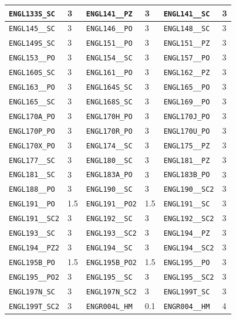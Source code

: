 \begin{longtable}{|l|l||l|l||l|l|}
    \verb|ENGL133S_SC| & 3 & \verb|ENGL141__PZ| & 3 & \verb|ENGL141__SC| & 3\\\hline
    \verb|ENGL145__SC| & 3 & \verb|ENGL146__PO| & 3 & \verb|ENGL148__SC| & 3\\\hline
    \verb|ENGL149S_SC| & 3 & \verb|ENGL151__PO| & 3 & \verb|ENGL151__PZ| & 3\\\hline
    \verb|ENGL153__PO| & 3 & \verb|ENGL154__SC| & 3 & \verb|ENGL157__PO| & 3\\\hline
    \verb|ENGL160S_SC| & 3 & \verb|ENGL161__PO| & 3 & \verb|ENGL162__PZ| & 3\\\hline
    \verb|ENGL163__PO| & 3 & \verb|ENGL164S_SC| & 3 & \verb|ENGL165__PO| & 3\\\hline
    \verb|ENGL165__SC| & 3 & \verb|ENGL168S_SC| & 3 & \verb|ENGL169__PO| & 3\\\hline
    \verb|ENGL170A_PO| & 3 & \verb|ENGL170H_PO| & 3 & \verb|ENGL170J_PO| & 3\\\hline
    \verb|ENGL170P_PO| & 3 & \verb|ENGL170R_PO| & 3 & \verb|ENGL170U_PO| & 3\\\hline
    \verb|ENGL170X_PO| & 3 & \verb|ENGL174__SC| & 3 & \verb|ENGL175__PZ| & 3\\\hline
    \verb|ENGL177__SC| & 3 & \verb|ENGL180__SC| & 3 & \verb|ENGL181__PZ| & 3\\\hline
    \verb|ENGL181__SC| & 3 & \verb|ENGL183A_PO| & 3 & \verb|ENGL183B_PO| & 3\\\hline
    \verb|ENGL188__PO| & 3 & \verb|ENGL190__SC| & 3 & \verb|ENGL190__SC2| & 3\\\hline
    \verb|ENGL191__PO| & 1.5 & \verb|ENGL191__PO2| & 1.5 & \verb|ENGL191__SC| & 3\\\hline
    \verb|ENGL191__SC2| & 3 & \verb|ENGL192__SC| & 3 & \verb|ENGL192__SC2| & 3\\\hline
    \verb|ENGL193__SC| & 3 & \verb|ENGL193__SC2| & 3 & \verb|ENGL194__PZ| & 3\\\hline
    \verb|ENGL194__PZ2| & 3 & \verb|ENGL194__SC| & 3 & \verb|ENGL194__SC2| & 3\\\hline
    \verb|ENGL195B_PO| & 1.5 & \verb|ENGL195B_PO2| & 1.5 & \verb|ENGL195__PO| & 3\\\hline
    \verb|ENGL195__PO2| & 3 & \verb|ENGL195__SC| & 3 & \verb|ENGL195__SC2| & 3\\\hline
    \verb|ENGL197N_SC| & 3 & \verb|ENGL197N_SC2| & 3 & \verb|ENGL199T_SC| & 3\\\hline
    \verb|ENGL199T_SC2| & 3 & \verb|ENGR004L_HM| & 0.1 & \verb|ENGR004__HM| & 4\\\hline

\end{longtable}
